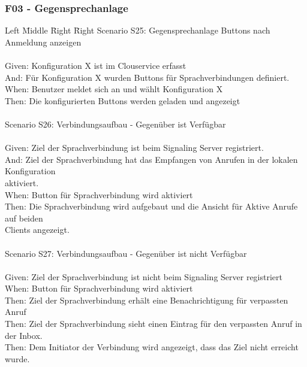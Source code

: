 \subsubsection*{F03 - Gegensprechanlage}
\begin{tabbing}
    Left \= Middle \= Right \= Right \kill
    Scenario S25: \> \> \> Gegensprechanlage Buttons nach Anmeldung anzeigen \\ \\
    Given:  \> \> \>  Konfiguration X ist im Clouservice erfasst\\
    And:  \> \> \>  Für Konfiguration X wurden Buttons für Sprachverbindungen definiert.  \\
    When:   \> \> \> Benutzer meldet sich an und wählt Konfiguration X\\
    Then:   \> \> \> Die konfigurierten Buttons werden geladen und angezeigt\\
    \\
    Scenario S26: \> \> \> Verbindungsaufbau - Gegenüber ist Verfügbar \\ \\
    Given:  \> \> \> Ziel der Sprachverbindung ist beim Signaling Server registriert. \\
    And:  \> \> \> Ziel der Sprachverbindung hat das Empfangen von Anrufen in der lokalen Konfiguration \\
    \> \> \> aktiviert. \\
    When:   \> \> \> Button für Sprachverbindung wird aktiviert \\
    Then:   \> \> \> Die Sprachverbindung wird aufgebaut und die Ansicht für Aktive Anrufe auf beiden \\
    \> \> \> Clients angezeigt.\\
    \\
    Scenario S27: \> \> \> Verbindungsaufbau - Gegenüber ist nicht Verfügbar \\ \\
    Given:  \> \> \> Ziel der Sprachverbindung ist nicht beim Signaling Server registriert\\
    When:   \> \> \> Button für Sprachverbindung wird aktiviert\\
    Then:   \> \> \> Ziel der Sprachverbindung erhält eine Benachrichtigung für verpassten Anruf\\
    Then:   \> \> \> Ziel der Sprachverbindung sieht einen Eintrag für den verpassten Anruf in der Inbox.\\
    Then:   \> \> \> Dem Initiator der Verbindung wird angezeigt, dass das Ziel nicht erreicht wurde. \\

\end{tabbing}
